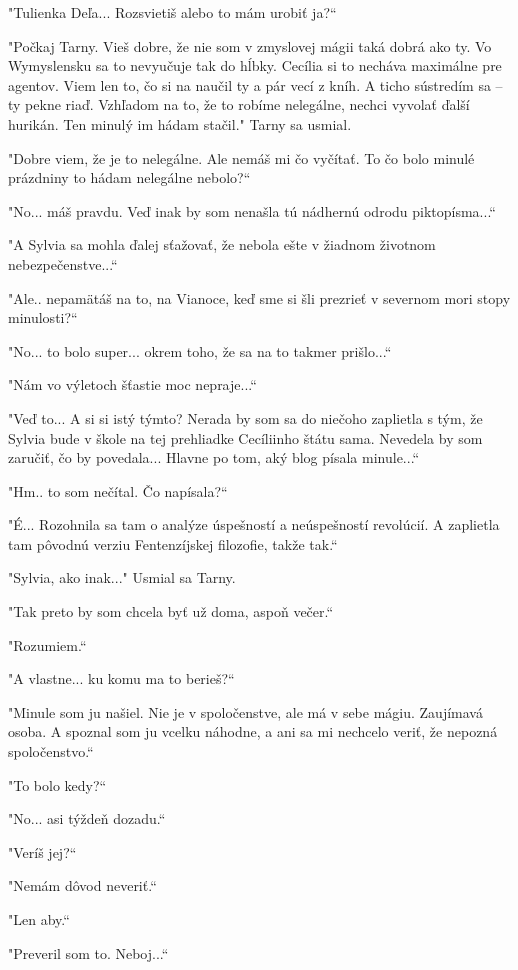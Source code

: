 \documentclass{book}
\begin{document}
"Tulienka Deľa... Rozsvietiš alebo to mám urobiť ja?“

"Počkaj Tarny. Vieš dobre, že nie som v zmyslovej mágii taká dobrá ako ty. Vo Wymyslensku sa to nevyučuje tak do hĺbky. Cecília si to necháva maximálne pre agentov. Viem len to, čo si na naučil ty a pár vecí z kníh. A ticho sústredím sa – ty pekne riaď. Vzhľadom na to, že to robíme nelegálne, nechci vyvolať ďalší hurikán. Ten minulý im hádam stačil."$ $ Tarny sa usmial.

"Dobre viem, že je to nelegálne. Ale nemáš mi čo vyčítať. To čo bolo minulé prázdniny to hádam nelegálne nebolo?“

"No... máš pravdu. Veď inak by som nenašla tú nádhernú odrodu piktopísma...“

"$ $A Sylvia sa mohla ďalej sťažovať, že nebola ešte v žiadnom životnom nebezpečenstve...“

"$ $Ale.. nepamätáš na to, na Vianoce, keď sme si šli prezrieť v severnom mori stopy minulosti?“

"No... to bolo super... okrem toho, že sa na to takmer prišlo...“

"Nám vo výletoch šťastie moc nepraje...“

"Veď to... A si si istý týmto? Nerada by som sa do niečoho zaplietla s tým, že Sylvia bude v škole na tej prehliadke Cecíliinho štátu sama. Nevedela by som zaručiť, čo by povedala... Hlavne po tom, aký blog písala minule...“

"Hm.. to som nečítal. Čo napísala?“

"É... Rozohnila sa tam o analýze úspešností a neúspešností revolúcií. A zaplietla tam pôvodnú verziu Fentenzíjskej filozofie, takže tak.“

"Sylvia, ako inak..."$ $ Usmial sa Tarny.

"Tak preto by som chcela byť už doma, aspoň večer.“

"Rozumiem.“

"$ $A vlastne... ku komu ma to berieš?“

"Minule som ju našiel. Nie je v spoločenstve, ale má v sebe mágiu. Zaujímavá osoba. A spoznal som ju vcelku náhodne, a ani sa mi nechcelo veriť, že nepozná spoločenstvo.“

"To bolo kedy?“

"No... asi týždeň dozadu.“

"Veríš jej?“

"Nemám dôvod neveriť.“

"Len aby.“

"Preveril som to. Neboj...“
\end{document}
